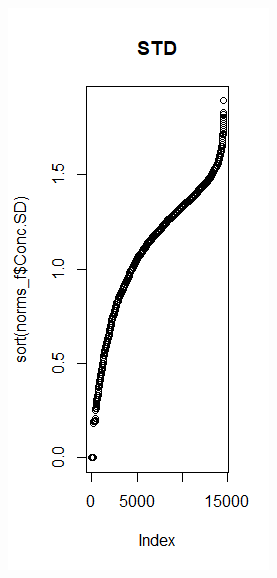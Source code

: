 \documentclass[11pt,a4paper]{article}
\begin{document}
\begin{figure}[H]
  \centering
  \begin{subfigure}[b]{0.4\linewidth}
    \includegraphics[width=\linewidth]{images/std_norm.png}

\end{subfigure}
\end{figure}
\end{document}
